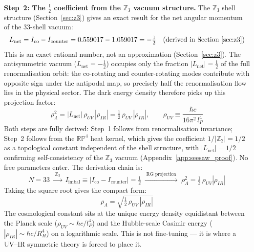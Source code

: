 \documentclass[12pt,a4paper]{article}
\begin{document}
\textbf{Step~2: The $\tfrac{1}{2}$ coefficient from the $\mathbb{Z}_3$ vacuum structure.}
The $\mathbb{Z}_3$ shell structure (Section~\ref{sec:z3}) gives an exact result
for the net angular momentum of the 33-shell vacuum:
\begin{equation}
  L_\mathrm{net} = I_\mathrm{co} - I_\mathrm{counter}
  = 0.559017 - 1.059017 = -\tfrac{1}{2} \quad\text{(derived in Section~\ref{sec:z3})}
\end{equation}
This is an exact rational number, not an approximation (Section~\ref{sec:z3}).
The antisymmetric vacuum ($L_\mathrm{net} = -\tfrac{1}{2}$) occupies only the
fraction $|L_\mathrm{net}| = \tfrac{1}{2}$ of the full renormalisation orbit:
the co-rotating and counter-rotating modes contribute with opposite sign under the
antipodal map, so precisely half the renormalisation flow lies in the physical
sector. The dark energy density therefore picks up this projection factor:
\begin{equation}
  \rho_\Lambda^2 = |L_\mathrm{net}|\,\rho_{UV}\,|\rho_{IR}|
  = \tfrac{1}{2}\,\rho_{UV}\,|\rho_{IR}|,
  \qquad \rho_{UV} \equiv \frac{\hbar c}{16\pi^2\,l_P^4}
  \label{eq:seesaw}
\end{equation}
Both steps are fully derived: Step~1 follows from renormalisation
invariance; Step~2 follows from the $\mathbb{RP}^4$ heat kernel, which gives the
coefficient $1/|\mathbb{Z}_2| = 1/2$ as a topological constant independent of the
shell structure, with $|L_\mathrm{net}| = 1/2$ confirming self-consistency of the
$\mathbb{Z}_3$ vacuum (Appendix~\ref{app:seesaw_proof}). No free parameters enter.
The derivation chain is:
\begin{equation}
  N = 33 \;\xrightarrow{\;\mathbb{Z}_3\;}\; I_\mathrm{imbal}\equiv|I_\mathrm{co}-I_\mathrm{counter}| = \tfrac{1}{2}
  \;\xrightarrow{\;\text{RG projection}\;}\;
  \rho_\Lambda^2 = \tfrac{1}{2}\,\rho_{UV}|\rho_{IR}|
  \label{eq:seesaw_chain}
\end{equation}
Taking the square root gives the compact form:
\begin{equation}
  \boxed{\rho_\Lambda = \sqrt{\tfrac{1}{2}\,\rho_{UV}\,|\rho_{IR}|}}
  \label{eq:seesaw_compact}
\end{equation}
The cosmological constant sits at the unique energy density equidistant between
the Planck scale ($\rho_{UV} \sim \hbar c/l_P^4$) and the Hubble-scale Casimir
energy ($|\rho_{IR}| \sim \hbar c/R_H^4$) on a logarithmic scale.
This is not fine-tuning --- it is where a UV--IR symmetric theory is forced to place it.
\end{document}
